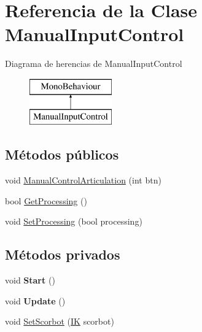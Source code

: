 \hypertarget{class_manual_input_control}{}\section{Referencia de la Clase Manual\+Input\+Control}
\label{class_manual_input_control}
Diagrama de herencias de Manual\+Input\+Control\begin{figure}[H]
\begin{center}
\leavevmode
\includegraphics[height=2.000000cm]{class_manual_input_control}
\end{center}
\end{figure}
\subsection*{Métodos públicos}
\begin{DoxyCompactItemize}
\item 
void \mbox{\hyperlink{class_manual_input_control_a1e39de6319d6aad69e82f083d6d42058}{Manual\+Control\+Articulation}} (int btn)
\item 
bool \mbox{\hyperlink{class_manual_input_control_a00de8f95d74cefb32806a4262fd90aba}{Get\+Processing}} ()
\item 
void \mbox{\hyperlink{class_manual_input_control_a8505abe190f5ce3a1a1b76d2e94e695f}{Set\+Processing}} (bool processing)
\end{DoxyCompactItemize}
\subsection*{Métodos privados}
\begin{DoxyCompactItemize}
\item 
\mbox{\label{class_manual_input_control_acc8776421340f27cc602a8b20dae4c3f}} 
void {\bfseries Start} ()
\item 
\mbox{\label{class_manual_input_control_a1f99322a0b2569fe0a38a8ffa594a7ac}} 
void {\bfseries Update} ()
\item 
void \mbox{\hyperlink{class_manual_input_control_a89c690df272f067ef8eef89ac0108e78}{Set\+Scorbot}} (\mbox{\hyperlink{class_i_k}{IK}} scorbot)
\end{DoxyCompactItemize}
